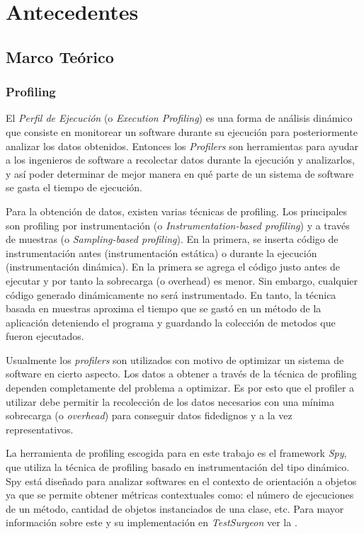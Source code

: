 \chapter{Antecedentes}


\section{Marco Teórico}

\subsection{Profiling}

\par El \emph{Perfil de Ejecución} (o \emph{Execution Profiling}) es una forma de análisis dinámico que consiste en monitorear un software durante su ejecución para posteriormente analizar los datos obtenidos. Entonces los \emph{Profilers} son herramientas para ayudar a los ingenieros de software a recolectar datos durante la ejecución y analizarlos, y así poder determinar de mejor manera en qué parte de un sistema de software se gasta el tiempo de ejecución.


\par Para la obtención de datos, existen varias técnicas de profiling. Los principales son profiling por instrumentación (o \emph{Instrumentation-based profiling}) y a través de muestras (o \emph{Sampling-based profiling}). En la primera, se inserta código de instrumentación antes (instrumentación estática) o durante la ejecución (instrumentación dinámica). En la primera se agrega el código justo antes de ejecutar y por tanto la sobrecarga (o overhead) es menor. Sin embargo, cualquier código generado dinámicamente no será instrumentado. En tanto, la técnica basada en muestras aproxima el tiempo que se gastó en un método de la aplicación deteniendo el programa y guardando la colección de metodos que fueron ejecutados.

\par Usualmente los \emph{profilers} son utilizados con motivo de optimizar un sistema de software en cierto aspecto. Los datos a obtener a través de la técnica de profiling dependen completamente del problema a optimizar. Es por esto que el profiler a utilizar debe permitir la recolección de los datos necesarios con una mínima sobrecarga (o \emph{overhead}) para conseguir datos fidedignos y a la vez representativos. 

\par La herramienta de profiling escogida para en este trabajo es el framework \emph{Spy}, que utiliza la técnica de profiling basado en instrumentación del tipo dinámico. Spy está diseñado para analizar softwares en el contexto de orientación a objetos ya que se permite obtener métricas contextuales como: el número de ejecuciones de un método, cantidad de objetos instanciados de una clase, etc. Para mayor información sobre este y su implementación en \emph{TestSurgeon} ver la . 

